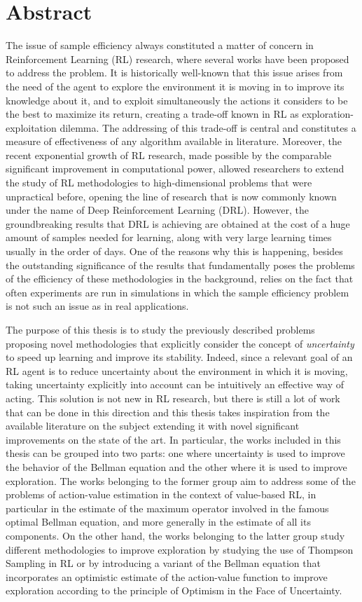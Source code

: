 \chapter*{Abstract}
The issue of sample efficiency always constituted a matter of concern in Reinforcement Learning (RL) research, where several works have been proposed to address the problem. It is historically well-known that this issue arises from the need of the agent to explore the environment it is moving in to improve its knowledge about it, and to exploit simultaneously the actions it considers to be the best to maximize its return, creating a trade-off known in RL as exploration-exploitation dilemma. The addressing of this trade-off is central and constitutes a measure of effectiveness of any algorithm available in literature. Moreover, the recent exponential growth of RL research, made possible by the comparable significant improvement in computational power, allowed researchers to extend the study of RL methodologies to high-dimensional problems that were unpractical before, opening the line of research that is now commonly known under the name of Deep Reinforcement Learning (DRL). However, the groundbreaking results that DRL is achieving are obtained at the cost of a huge amount of samples needed for learning, along with very large learning times usually in the order of days. One of the reasons why this is happening, besides the outstanding significance of the results that fundamentally poses the problems of the efficiency of these methodologies in the background, relies on the fact that often experiments are run in simulations in which the sample efficiency problem is not such an issue as in real applications.

The purpose of this thesis is to study the previously described problems proposing novel methodologies that explicitly consider the concept of \textit{uncertainty} to speed up learning and improve its stability. Indeed, since a relevant goal of an RL agent is to reduce uncertainty about the environment in which it is moving, taking uncertainty explicitly into account can be intuitively an effective way of acting. This solution is not new in RL research, but there is still a lot of work that can be done in this direction and this thesis takes inspiration from the available literature on the subject extending it with novel significant improvements on the state of the art. In particular, the works included in this thesis can be grouped into two parts: one where uncertainty is used to improve the behavior of the Bellman equation and the other where it is used to improve exploration. The works belonging to the former group aim to address some of the problems of action-value estimation in the context of value-based RL, in particular in the estimate of the maximum operator involved in the famous optimal Bellman equation, and more generally in the estimate of all its components. On the other hand, the works belonging to the latter group study different methodologies to improve exploration by studying the use of Thompson Sampling in RL or by introducing a variant of the Bellman equation that incorporates an optimistic estimate of the action-value function to improve exploration according to the principle of Optimism in the Face of Uncertainty.


